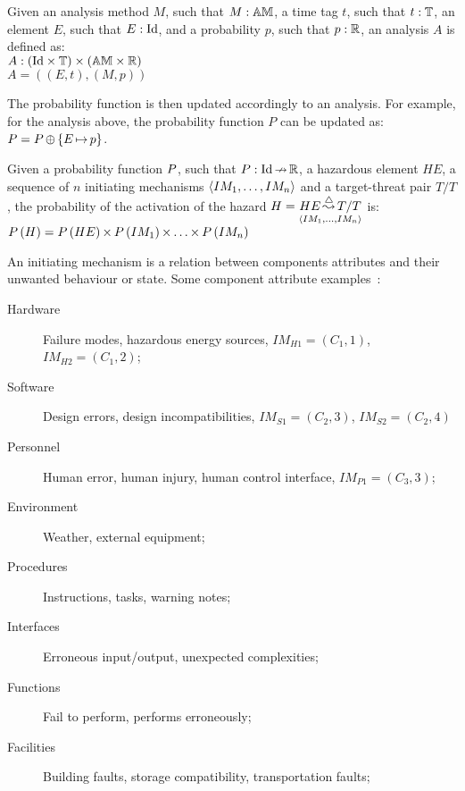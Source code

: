 \begin{definition}[Analysis]
Given an analysis method $M$, such that $M: \hmdatatypeAM$, a time tag $t$, such that $t:\hmdatatypetimetag$, an element $E$, such that $E:\hmdatatypeId$, and a probability $p$, such that $p:\hmdatatypeR$, an analysis $A$ is defined as:
%
\\$A: \hmcartesian{\left(\hmcartesian{\hmdatatypeId}{\hmdatatypetimetag}\right)}{\left(\hmcartesian{\hmdatatypeAM}{\hmdatatypeR}\right)}$
%
\\$A = \left(\left(E, t\right), \left(M, p\right) \right)$

\end{definition}
The probability function is then updated accordingly to an analysis. For example, for the analysis above, the probability function $P$ can be updated as:
$\hmprobabilitysymbol = \hmoverride{\hmprobabilitysymbol}{\left\{\hmmapsto{E}{p}\right\}}$.

\begin{definition}
Given a probability function $\hmprobabilitysymbol$, such that $P: \hmpartialfunction {\hmdatatypeId}{\hmdatatypeR}$, a hazardous element $HE$, a sequence of $n$ initiating mechanisms $\hmseqenum{IM_1,\ldots,IM_n}$ and a target-threat pair $T/T$, the probability of the activation of the hazard $H = \hmhazard{HE}{\hmseqenum{IM_1,\ldots,IM_n}}{T/T}$ is:
%
\\$\hmprobability{H} = \hmtimes{\hmprobability{HE}}{\hmtimes{\hmtimes{\hmprobability{IM_1}}{\ldots}}{\hmprobability{IM_n}}}$
\end{definition}

\begin{definition}
An initiating mechanism is a relation between components attributes and their unwanted behaviour or state. 
%
Some component attribute examples~\cite{EricsonII2005}:
\begin{description}
  \item[Hardware] Failure modes, hazardous energy sources, $IM_{H1}=\left(C_1,1\right)$, $IM_{H2}=\left(C_1,2\right)$;
  \item[Software] Design errors, design incompatibilities, $IM_{S1}=\left(C_2,3\right)$, $IM_{S2}=\left(C_2,4\right)$
  \item[Personnel] Human error, human injury, human control interface, $IM_{P1}=\left(C_3,3\right)$;
  \item[Environment] Weather, external equipment;
  \item[Procedures] Instructions, tasks, warning notes;
  \item[Interfaces] Erroneous input/output, unexpected complexities;
  \item[Functions] Fail to perform, performs erroneously;
  \item[Facilities] Building faults, storage compatibility, transportation faults;
\end{description}
\end{definition}

